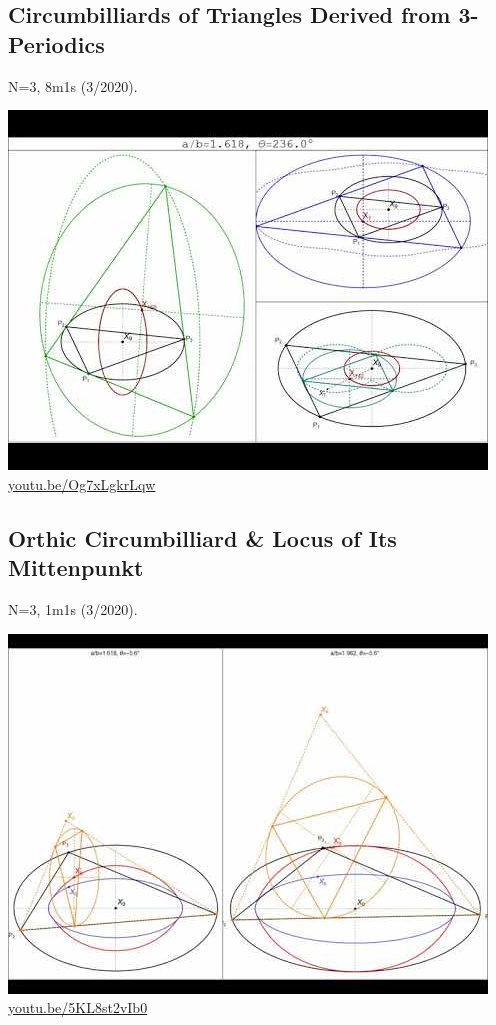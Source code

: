 \documentclass[12pt]{amsart}
\begin{document}
\subsection{Circumbilliards of Triangles Derived from 3-Periodics}
\label{vid:Og7xLgkrLqw}
\noindent N=3, 8m1s (3/2020). 
\begin{center}\includegraphics[width=.5\textwidth]{pics/Og7xLgkrLqw.jpg} \\ 
\href{https://youtu.be/Og7xLgkrLqw}{\url{youtu.be/Og7xLgkrLqw}}\end{center}
% 

\subsection{Orthic Circumbilliard \& Locus of Its Mittenpunkt}
\label{vid:5KL8st2vIb0}
\noindent N=3, 1m1s (3/2020). 
\begin{center}\includegraphics[width=.5\textwidth]{pics/5KL8st2vIb0.jpg} \\ 
\href{https://youtu.be/5KL8st2vIb0}{\url{youtu.be/5KL8st2vIb0}}\end{center}
% 
\end{document}

